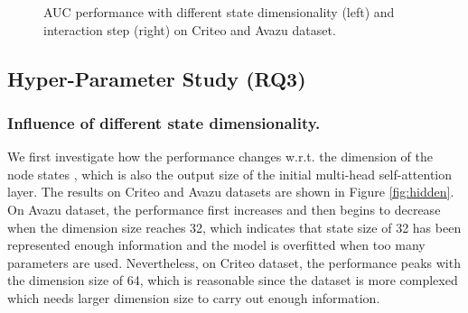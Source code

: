 \documentclass[sigconf]{acmart}
\begin{document}
\begin{figure}[t]
\centering
{}\caption{AUC performance with different state dimensionality  (left) and interaction step  (right) on Criteo and Avazu dataset.}
\label{fig:performance}
\vspace{-4mm}
\end{figure}


\subsection{Hyper-Parameter Study (RQ3)}

\subsubsection{\textbf{Influence of different state dimensionality.}}
We first investigate how the performance changes w.r.t. the dimension of the node states , which is also the output size of the initial multi-head self-attention layer. 
The results on Criteo and Avazu datasets are shown in Figure \ref{fig:hidden}.
On Avazu dataset, the performance first increases and then begins to decrease when the dimension size reaches 32, which indicates that state size of 32 has been represented enough information and the model is overfitted when too many parameters are used. 
Nevertheless, on Criteo dataset, the performance peaks with the dimension size of 64, which is reasonable since the dataset is more complexed which needs larger dimension size to carry out enough information.
\end{document}
